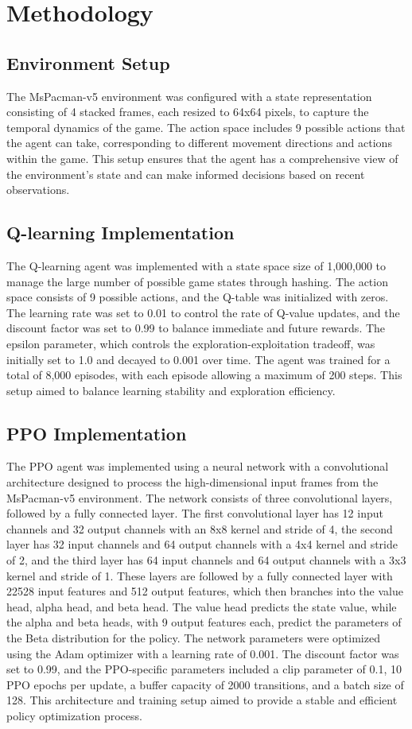 \documentclass[final,numbers]{article}
\begin{document}
\section{Methodology}
\subsection{Environment Setup}
The MsPacman-v5 environment was configured with a state representation consisting of 4 stacked frames, each resized to 64x64 pixels, to capture the temporal dynamics of the game. The action space includes 9 possible actions that the agent can take, corresponding to different movement directions and actions within the game. This setup ensures that the agent has a comprehensive view of the environment's state and can make informed decisions based on recent observations.

\subsection{Q-learning Implementation}
The Q-learning agent was implemented with a state space size of 1,000,000 to manage the large number of possible game states through hashing. The action space consists of 9 possible actions, and the Q-table was initialized with zeros. The learning rate was set to 0.01 to control the rate of Q-value updates, and the discount factor was set to 0.99 to balance immediate and future rewards. The epsilon parameter, which controls the exploration-exploitation tradeoff, was initially set to 1.0 and decayed to 0.001 over time. The agent was trained for a total of 8,000 episodes, with each episode allowing a maximum of 200 steps. This setup aimed to balance learning stability and exploration efficiency.

\subsection{PPO Implementation}
The PPO agent was implemented using a neural network with a convolutional architecture designed to process the high-dimensional input frames from the MsPacman-v5 environment. The network consists of three convolutional layers, followed by a fully connected layer. The first convolutional layer has 12 input channels and 32 output channels with an 8x8 kernel and stride of 4, the second layer has 32 input channels and 64 output channels with a 4x4 kernel and stride of 2, and the third layer has 64 input channels and 64 output channels with a 3x3 kernel and stride of 1. These layers are followed by a fully connected layer with 22528 input features and 512 output features, which then branches into the value head, alpha head, and beta head. The value head predicts the state value, while the alpha and beta heads, with 9 output features each, predict the parameters of the Beta distribution for the policy. The network parameters were optimized using the Adam optimizer with a learning rate of 0.001. The discount factor was set to 0.99, and the PPO-specific parameters included a clip parameter of 0.1, 10 PPO epochs per update, a buffer capacity of 2000 transitions, and a batch size of 128. This architecture and training setup aimed to provide a stable and efficient policy optimization process.
\end{document}
